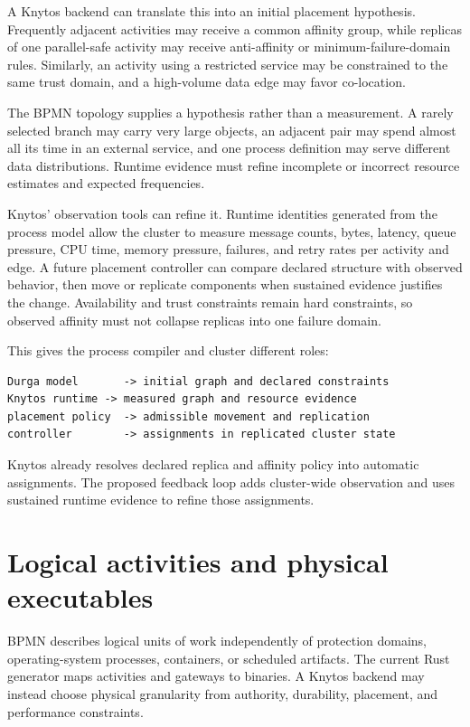 A Knytos backend can translate this into an initial placement hypothesis.
Frequently adjacent activities may receive a common affinity group, while replicas of
one parallel-safe activity may receive anti-affinity or minimum-failure-domain
rules. Similarly, an activity using a restricted service may be constrained to the same
trust domain, and a high-volume data edge may favor co-location.

The BPMN topology supplies a hypothesis rather than a measurement. A rarely
selected branch may carry very large objects, an adjacent pair may spend almost
all its time in an external service, and one process definition may serve
different data distributions. Runtime evidence must refine incomplete or
incorrect resource estimates and expected frequencies.

Knytos' observation tools can refine it. Runtime identities generated
from the process model allow the cluster to measure message counts, bytes,
latency, queue pressure, CPU time, memory pressure, failures, and retry rates per
activity and edge. A future placement controller can compare declared structure
with observed behavior, then move or replicate components when sustained
evidence justifies the change. Availability and trust constraints remain hard
constraints, so observed affinity must not collapse replicas into one failure
domain.

This gives the process compiler and cluster different roles:

\begin{verbatim}
Durga model       -> initial graph and declared constraints
Knytos runtime -> measured graph and resource evidence
placement policy  -> admissible movement and replication
controller        -> assignments in replicated cluster state
\end{verbatim}

Knytos already resolves declared replica and affinity policy into automatic
assignments. The proposed feedback loop adds cluster-wide observation and uses
sustained runtime evidence to refine those assignments.

\section{Logical activities and physical executables}

BPMN describes logical units of work independently of protection domains,
operating-system processes, containers, or scheduled artifacts. The current
Rust generator maps activities and gateways to binaries. A Knytos backend
may instead choose physical granularity from authority, durability, placement,
and performance constraints.

